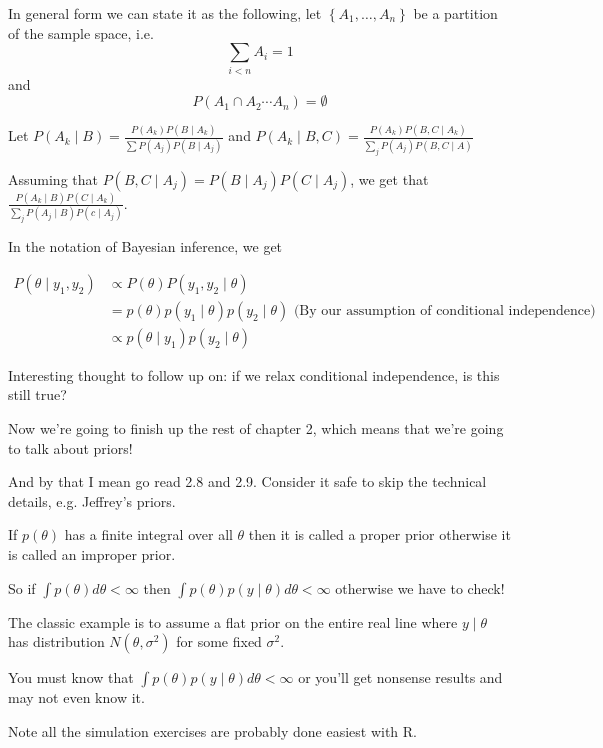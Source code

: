 \documentclass[a4paper]{article}
\begin{document}
In general form we can state it as the following, let $\left\{ A_1, \ldots, A_n \right\}$ be a partition of the sample space, i.e.
\begin{equation}
	\sum _{i < n} A_i = 1
\end{equation}
and
\begin{equation}
	P\left( A_1 \cap A_2 \cdots A_n \right) = \emptyset
\end{equation}

Let $P\left( A_k \mid B \right) = \frac{P\left( A_k \right) P\left( B \mid A_k \right)}{\sum P(A_j) P\left( B \mid A_j \right)}$ and $P\left( A_k \mid B, C \right) = \frac{P\left( A_k \right) P\left( B, C \mid A_k \right)}{\sum _j P\left( A_j \right) P\left( B, C \mid A \right)}$

Assuming that $P\left( B, C \mid A_j \right) = P\left( B \mid A_j \right) P\left( C \mid A_j \right)$, we get that $\frac{P\left( A_k \mid B \right) P\left( C \mid A_k \right)}{\sum _j P\left( A_j \mid B \right) P\left( c \mid A_j \right)}$.

In the notation of Bayesian inference, we get

\begin{align}
	P\left( \theta \mid y_1, y_2 \right) &\propto P\left( \theta \right) P\left( y_1, y_2 \mid \theta \right) \\
	&= p\left( \theta \right) p\left( y_1 \mid \theta \right) p\left( y_2 \mid \theta \right) \text{  (By our assumption of conditional independence)}\\
	&\propto p\left( \theta \mid y_1 \right) p\left( y_2 \mid \theta \right)
\end{align}

Interesting thought to follow up on: if we relax conditional independence, is this still true?

Now we're going to finish up the rest of chapter 2, which means that we're going to talk about priors!

And by that I mean go read 2.8 and 2.9.  Consider it safe to skip the technical
details, e.g. Jeffrey's priors.

If $p(\theta)$ has a finite integral over all $\theta$ then it is called a
proper prior otherwise it is called an improper prior.

So if $\int p\left( \theta \right) d\theta < \infty$ then $\int p\left( \theta \right) p\left( y \mid \theta \right) d\theta < \infty$ otherwise we have to check!

The classic example is to assume a flat prior on the entire real line where $y \mid \theta$ has distribution $N(\theta, \sigma ^2)$ for some fixed $\sigma ^2$.

You must know that $\int p\left( \theta \right) p\left( y \mid \theta \right) d \theta < \infty$ or you'll get nonsense results and may not even know it.

Note all the simulation exercises are probably done easiest with R.
\end{document}
